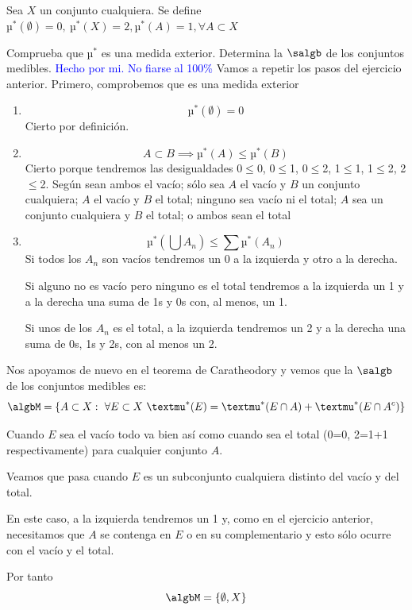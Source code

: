 \begin{problem}[13]
Sea $X$ un conjunto cualquiera. Se define $µ^*(\emptyset)=0, \ µ^*(X)=2, µ^*(A)=1, \forall A \subset X$

Comprueba que $µ^*$ es una medida exterior. Determina la $\salgb$ de los conjuntos medibles.
\solution
\textcolor{blue}{Hecho por mi. No fiarse al 100\%}
Vamos a repetir los pasos del ejercicio anterior. Primero, comprobemos que es una medida exterior
\begin{enumerate}
\item
\[µ^*(\emptyset)=0\]
Cierto por definición.
\item
\[A \subset B \implies µ^*(A)\leq µ^*(B)\]
Cierto porque tendremos las desigualdades 0$\leq$0, 0$\leq$1, 0$\leq$2, 1$\leq$1, 1$\leq$2, 2$\leq$2. Según sean ambos el vacío; sólo sea $A$ el vacío y $B$ un conjunto cualquiera; $A$ el vacío y $B$ el total; ninguno sea vacío ni el total; $A$ sea un conjunto cualquiera y $B$ el total; o ambos sean el total
\item
\[µ^*(\bigcup A_n) \leq \sum µ^*(A_n)\]
Si todos los $A_n$ son vacíos tendremos un 0 a la izquierda y otro a la derecha.

Si alguno no es vacío pero ninguno es el total tendremos a la izquierda un 1 y a la derecha una suma de 1s y 0s con, al menos, un 1.

Si unos de los $A_n$ es el total, a la izquierda tendremos un 2 y a la derecha una suma de 0s, 1s y 2s, con al menos un 2.
\end{enumerate}

Nos apoyamos de nuevo en el teorema de Caratheodory y vemos que la $\salgb$ de los conjuntos medibles es:
\[\algbM = \{A \subset X: \ \forall E \subset X \ µ^*(E)=µ^*(E \cap A) + µ^*(E \cap A^c)\}\]

Cuando $E$ sea el vacío todo va bien así como cuando sea el total (0=0, 2=1+1 respectivamente) para cualquier conjunto $A$.

Veamos que pasa cuando $E$ es un subconjunto cualquiera distinto del vacío y del total.

En este caso, a la izquierda tendremos un 1 y, como en el ejercicio anterior, necesitamos que $A$ se contenga en $E$ o en su complementario y esto sólo ocurre con el vacío y el total.

Por tanto
\[\algbM = \{\emptyset, X\}\]
\end{problem}

